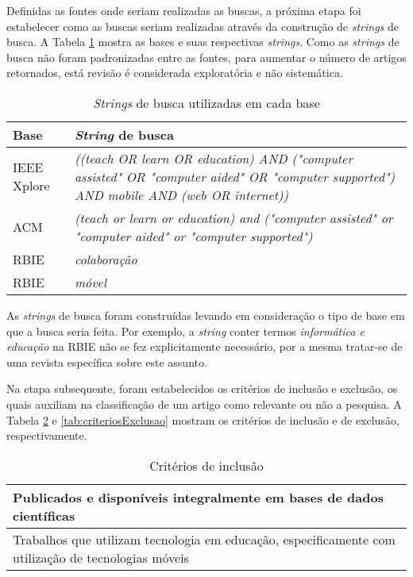 Definidas as fontes onde seriam realizadas as buscas, a próxima etapa foi estabelecer como as buscas seriam realizadas através da construção de \emph{strings} de busca. A Tabela \ref{tab:strings} mostra as bases e suas respectivas \emph{strings}. Como as \emph{strings} de busca não foram padronizadas entre as fontes, para aumentar o número de artigos retornados, está revisão é considerada exploratória e não sistemática.

\bgroup
\def\arraystretch{1.5} %
\begin{table}[h]{} %
\centering
\caption{\emph{Strings} de busca utilizadas em cada base}
\begin{tabular}{ | p{3cm} | p{10cm}| } \hline
\textbf{Base} & \textbf{\emph{String} de busca} \\ \hline
IEEE Xplore & \emph{((teach OR learn OR education) AND ("computer assisted" OR "computer aided" OR "computer supported") AND mobile AND (web OR internet))} \\ \hline
ACM & \emph{(teach or learn or education) and ("computer assisted" or "computer aided" or "computer supported")} \\ \hline
RBIE & \emph{colaboração} \\ \hline
RBIE & \emph{móvel} \\ \hline
\end{tabular}
\label{tab:strings}
\end{table}
\egroup

As \emph{strings} de busca foram construídas levando em consideração o tipo de base em que a busca seria feita. Por exemplo, a \emph{string} conter termos \emph{informática e educação} na RBIE não se fez explicitamente necessário, por a mesma tratar-se de uma revista específica sobre este assunto.

Na etapa subsequente, foram estabelecidos os critérios de inclusão e exclusão, os quais auxiliam na classificação de um artigo como relevante ou não a pesquisa. A Tabela \ref{tab:criteriosInclusao} e \ref{tab:criteriosExclusao} mostram os critérios de inclusão e de exclusão, respectivamente.
\bgroup
\def\arraystretch{1.5} %
\begin{table}[h]{} %
\centering
\caption{Critérios de inclusão}
\begin{tabular}{ | p{14cm}| } \hline
Publicados e disponíveis integralmente em bases de dados científicas \\ \hline
Trabalhos que utilizam tecnologia em educação, especificamente com utilização de tecnologias móveis \\ \hline
\end{tabular}
\label{tab:criteriosInclusao}
\end{table}
\egroup



